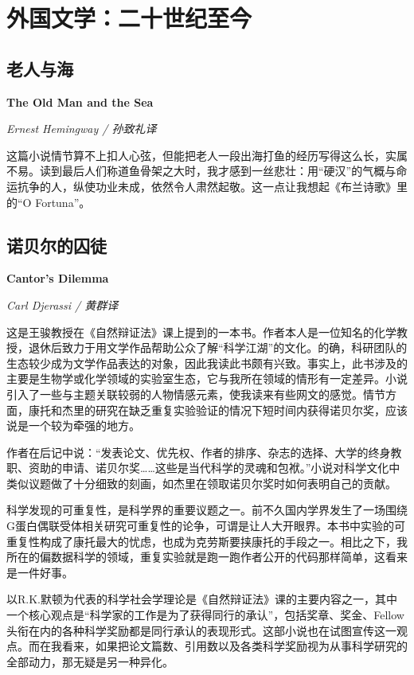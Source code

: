 \section{外国文学：二十世纪至今}

\subsection*{老人与海}
\par \textbf{The Old Man and the Sea}
\par \emph{Ernest Hemingway / 孙致礼译} 
\par 这篇小说情节算不上扣人心弦，但能把老人一段出海打鱼的经历写得这么长，实属不易。读到最后人们称道鱼骨架之大时，我才感到一丝悲壮：用“硬汉”的气概与命运抗争的人，纵使功业未成，依然令人肃然起敬。这一点让我想起《布兰诗歌》里的“O Fortuna”。
\par {}

\subsection*{诺贝尔的囚徒}
\par \textbf{Cantor’s Dilemma}
\par \emph{Carl Djerassi / 黄群译} 
\par 这是王骏教授在《自然辩证法》课上提到的一本书。作者本人是一位知名的化学教授，退休后致力于用文学作品帮助公众了解“科学江湖”的文化。的确，科研团队的生态较少成为文学作品表达的对象，因此我读此书颇有兴致。事实上，此书涉及的主要是生物学或化学领域的实验室生态，它与我所在领域的情形有一定差异。小说引入了一些与主题关联较弱的人物情感元素，使我读来有些网文的感觉。情节方面，康托和杰里的研究在缺乏重复实验验证的情况下短时间内获得诺贝尔奖，应该说是一个较为牵强的地方。
\par 作者在后记中说：“发表论文、优先权、作者的排序、杂志的选择、大学的终身教职、资助的申请、诺贝尔奖……这些是当代科学的灵魂和包袱。”小说对科学文化中类似议题做了十分细致的刻画，如杰里在领取诺贝尔奖时如何表明自己的贡献。
\par 科学发现的可重复性，是科学界的重要议题之一。前不久国内学界发生了一场围绕G蛋白偶联受体相关研究可重复性的论争，可谓是让人大开眼界。本书中实验的可重复性构成了康托最大的忧虑，也成为克劳斯要挟康托的手段之一。相比之下，我所在的偏数据科学的领域，重复实验就是跑一跑作者公开的代码那样简单，这看来是一件好事。
\par 以R.K.默顿为代表的科学社会学理论是《自然辩证法》课的主要内容之一，其中一个核心观点是“科学家的工作是为了获得同行的承认”，包括奖章、奖金、Fellow头衔在内的各种科学奖励都是同行承认的表现形式。这部小说也在试图宣传这一观点。而在我看来，如果把论文篇数、引用数以及各类科学奖励视为从事科学研究的全部动力，那无疑是另一种异化。
\par {}

